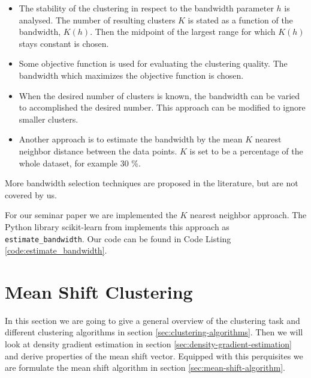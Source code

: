\documentclass{article}
\begin{document}
\begin{itemize}
	\item The stability of the clustering in respect to the bandwidth parameter $h$ is analysed. The number of resulting clusters $K$ is stated as a function of the bandwidth, $K(h)$. Then the midpoint of the largest range for which $K(h)$ stays constant is chosen.
	\item Some objective function is used for evaluating the clustering quality. The bandwidth which maximizes the objective function is chosen.
	\item When the desired number of clusters is known, the bandwidth can be varied to accomplished the desired number. This approach can be modified to ignore smaller clusters.
	\item Another approach is to estimate the bandwidth by the mean $K$ nearest neighbor distance between the data points. $K$ is set to be a percentage of the whole dataset, for example 30 \%.
\end{itemize}

More bandwidth selection techniques are proposed in the literature, but are not covered by us.

For our seminar paper we are implemented the $K$ nearest neighbor approach. The Python library scikit-learn from \cite{Pedregosa.2011} implements this approach as \texttt{estimate\_bandwidth}. Our code can be found in Code Listing \ref{code:estimate_bandwidth}.

%



\section{Mean Shift Clustering} \label{sec:mean-shift-clustering}

In this section we are going to give a general overview of the clustering task and different clustering algorithms in section \ref{sec:clustering-algorithms}. Then we will look at density gradient estimation in section \ref{sec:density-gradient-estimation} and derive properties of the mean shift vector. Equipped with this perquisites we are formulate the mean shift algorithm in section \ref{sec:mean-shift-algorithm}.
\end{document}
